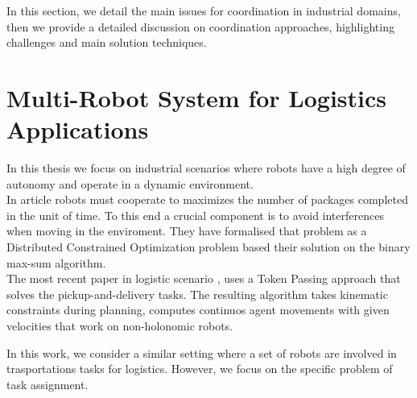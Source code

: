 In this section, we detail the main issues for \mrs coordination 
in industrial domains, then we provide a detailed discussion on coordination
approaches, highlighting challenges and main solution techniques.

\section{Multi-Robot System for Logistics Applications}
In this thesis we focus on industrial scenarios where robots have a high
degree of autonomy and operate in a dynamic environment.
\\
In article \cite{maxsum} robots must cooperate to maximizes the number of packages
completed in the unit of time. To this end a crucial component is to avoid interferences
when moving in the enviroment. They have formalised that problem as a Distributed 
Constrained Optimization problem based their solution on the binary max-sum algorithm.
\\
The most recent paper in logistic scenario \cite{mapd}, uses a Token Passing approach 
that solves the pickup-and-delivery tasks. The resulting algorithm takes kinematic 
constraints during planning, computes continuos agent movements with given velocities
that work on non-holonomic robots.

In this work, we consider a similar setting where a set of robots are involved
in trasportations tasks for logistics. However, we focus on the specific problem
of task assignment.







